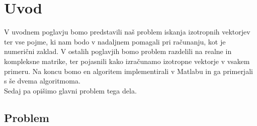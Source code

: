 \documentclass[12pt,a4paper]{amsart}
\theoremstyle{definition}
\theoremstyle{plain}
\begin{document}

\section{Uvod}
V uvodnem poglavju bomo predstavili naš problem iskanja izotropnih vektorjev ter vse pojme, ki nam bodo v nadaljnem pomagali pri računanju, kot je numerični zaklad. 
V ostalih poglavjih bomo problem razdelili na realne in kompleksne matrike, ter pojasnili kako izračunamo izotropne vektorje v vsakem primeru.
Na koncu bomo en algoritem implementirali v Matlabu in ga primerjali s še dvema algoritmoma.\\
Sedaj pa opišimo glavni problem tega dela.
\subsection{Problem}
\end{document}
